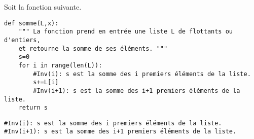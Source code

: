 

Soit la fonction suivante.
\begin{lstlisting}
def somme(L,x):
    """ La fonction prend en entrée une liste L de flottants ou d'entiers,
    et retourne la somme de ses éléments. """
    s=0
    for i in range(len(L)):
        #Inv(i): s est la somme des i premiers éléments de la liste.
        s+=L[i]
        #Inv(i+1): s est la somme des i+1 premiers éléments de la liste.
    return s
\end{lstlisting}

\ifprof
\begin{corrige}
\begin{lstlisting}
#Inv(i): s est la somme des i premiers éléments de la liste.
#Inv(i+1): s est la somme des i+1 premiers éléments de la liste.
\end{lstlisting}
\end{corrige}
\else
\fi